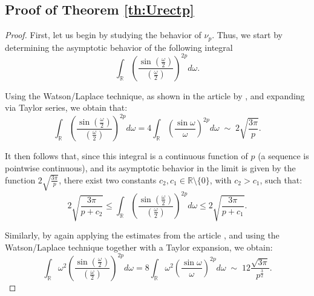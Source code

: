 \documentclass[preprint,hidelinks,authoryear]{elsarticle}
\theoremstyle{plain}
\theoremstyle{definition}
\theoremstyle{remark}
\begin{document}
\subsection{Proof of Theorem \ref{th:Urectp}}


\begin{proof}
    First, let us begin by studying the behavior of $\nu_p$. Thus, we start by determining the asymptotic behavior of the following integral
    \begin{equation}
    \displaystyle\int_{\mathbb{R}} \left(\displaystyle\frac{\sin{\displaystyle
    \left(\frac{\omega}{2}\right)}}{\left(\displaystyle
    \frac{\omega}{2}\right)}\right)^{2p} d\omega.
\end{equation}

Using the Watson/Laplace technique, as shown in the article by \cite{schlage2020asymptotic}, and expanding via Taylor series, we obtain that:
\begin{equation}
    \displaystyle\int_{\mathbb{R}} \left(\displaystyle\frac{\sin{\displaystyle
    \left(\frac{\omega}{2}\right)}}{\left(\displaystyle
    \frac{\omega}{2}\right)}\right)^{2p} d\omega=4\displaystyle\int_{\mathbb{R}} \left(\displaystyle\frac{\sin{\omega}}{\omega}\right)^{2p} d\omega \; \sim \; 2\displaystyle\sqrt{\frac{3\pi}{p}}.
\end{equation}

It then follows that, since this integral is a continuous function of $p$ (a sequence is pointwise continuous), and its asymptotic behavior in the limit is given by the function $2\sqrt{\frac{3\pi}{p}}$, there exist two constants $c_2, c_1 \in \mathbb{R} \setminus \{0\}$, with $c_2 > c_1$, such that:
\begin{equation}
      2\displaystyle\sqrt{\frac{3\pi}{p+c_2}} \le \displaystyle\int_{\mathbb{R}} \left(\displaystyle\frac{\sin{\displaystyle
    \left(\frac{\omega}{2}\right)}}{\left(\displaystyle
    \frac{\omega}{2}\right)}\right)^{2p} d\omega \le 2\displaystyle\sqrt{\frac{3\pi}{p+c_1}}.
    \label{disdis}
\end{equation}



Similarly, by again applying the estimates from the article \cite{schlage2020asymptotic}, and using the Watson/Laplace technique together with a Taylor expansion, we obtain:
\begin{equation}
     \displaystyle\int_{\mathbb{R}} \omega^2\left(\displaystyle\frac{\sin{\displaystyle
    \left(\frac{\omega}{2}\right)}}{\left(\displaystyle
    \frac{\omega}{2}\right)}\right)^{2p} d\omega=8\displaystyle\int_{\mathbb{R}} \omega^2\left(\displaystyle\frac{\sin{\omega}}{\omega}\right)^{2p} d\omega \; \sim \; 12\displaystyle\frac{\sqrt{3\pi}}{p^{\frac{3}{2}}}.
\end{equation}



\end{proof}
\end{document}
